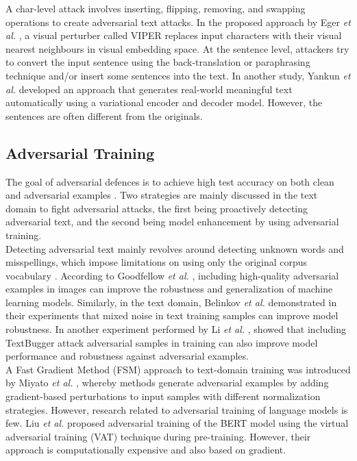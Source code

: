 \documentclass[%
	BCOR=8mm, %
	DIV=12,
	toc=bibliography, %
	toc=listof, %
	oneside, %
	egregdoesnotlikesansseriftitles, %
	]{scrbook}
\begin{document}
A char-level attack involves inserting, flipping, removing, and swapping operations to create adversarial text attacks. In the proposed approach by Eger \textit{et al.} \cite{eger_text_2019}, a visual perturber called VIPER replaces input characters with their visual nearest neighbours in visual embedding space.
At the sentence level, attackers try to convert the input sentence using the back-translation or paraphrasing technique and/or  insert some sentences into the text. 
In another study, Yankun \textit{et al.} \cite{ren_generating_2020}  developed an approach that generates real-world meaningful text automatically using a variational encoder and decoder model. However, the sentences are often different from the originals.

\subsection{Adversarial Training}
\label{subsection: adversarialtraining}
The goal of adversarial defences is to achieve high test accuracy on both clean and adversarial examples \cite{zhou_defense_2020}. Two strategies are mainly discussed in the text domain to fight adversarial attacks, the first being proactively detecting adversarial text, and the second being model enhancement by using adversarial training.\\
 Detecting adversarial text mainly revolves around detecting unknown words and misspellings, which impose limitations on using only the original corpus vocabulary \cite{wang_towards_2021}. 
According to Goodfellow \textit{et al.} \cite{goodfellow_explaining_2015}, including high-quality adversarial examples in images can improve the robustness and generalization of machine learning models. Similarly, in the text domain, Belinkov \textit{et al.}  \cite{belinkov_synthetic_2018} demonstrated in their experiments that mixed noise in text training samples can improve model robustness. In another experiment performed by Li \textit{et al.} \cite{li_textbugger_2019}, showed that including TextBugger attack adversarial samples in training can also improve model performance and robustness against adversarial examples.\\
A Fast Gradient Method (FSM) approach to text-domain training was introduced by Miyato \textit{et al.} \cite{miyato_adversarial_2017}, whereby methods generate adversarial examples by adding gradient-based perturbations to input samples with different normalization strategies.
However, research related to adversarial training of language models is few. Liu \textit{et al.} \cite{liu_adversarial_2020} proposed adversarial training of the BERT model using the virtual adversarial training (VAT) technique \cite{miyato_virtual_2018}  during pre-training. However, their approach is computationally expensive and also based on gradient.\\
\end{document}
